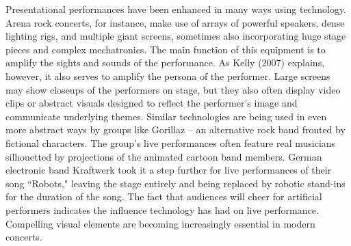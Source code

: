 Presentational performances have been enhanced in many ways using technology. Arena rock concerts, for instance, make use of arrays of powerful speakers, dense lighting rigs, and multiple giant screens, sometimes also incorporating huge stage pieces and complex mechatronics. The main function of this equipment is to amplify the sights and sounds of the performance. As Kelly (2007) explains, however, it also serves to amplify the persona of the performer. Large screens may show closeups of the performers on stage, but they also often display video clips or abstract visuals designed to reflect the performer's image and communicate underlying themes. Similar technologies are being used in even more abstract ways by groups like Gorillaz -- an alternative rock band fronted by fictional characters. The group's live performances often feature real musicians silhouetted by projections of the animated cartoon band members. German electronic band Kraftwerk took it a step further for live performances of their song ``Robots," leaving the stage entirely and being replaced by robotic stand-ins for the duration of the song. The fact that audiences will cheer for artificial performers indicates the influence technology has had on live performance. Compelling visual elements are becoming increasingly essential in modern concerts.

